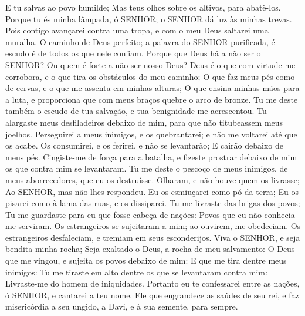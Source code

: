 {{  E tu salvas ao povo humilde; Mas teus olhos {} sobre os altivos, para abatê-los.
  Porque tu és minha lâmpada, ó SENHOR; o SENHOR dá luz às minhas trevas.
  Pois contigo avançarei contra uma tropa, e com o meu Deus saltarei uma muralha.
  O caminho de Deus {} perfeito; a palavra do SENHOR {} purificada, é escudo é de todos os que nele confiam.
  Porque que Deus há a não ser o SENHOR? Ou quem é forte a não ser nosso Deus?
  Deus é o que com virtude me corrobora, e o que tira os obstáculos do meu caminho;
  O que faz meus pés como de cervas, e o que me assenta em minhas alturas;
  O que ensina minhas mãos para a luta, e proporciona que com meus braços quebre o arco de bronze.
  Tu me deste também o escudo de tua salvação, e tua benignidade me acrescentou.
  Tu alargaste meus desfiladeiros debaixo de mim, para que não titubeassem meus joelhos.
  Perseguirei a meus inimigos, e os quebrantarei; e não me voltarei até que os acabe.
  Os consumirei, e os ferirei, e não se levantarão; E cairão debaixo de meus pés.
  Cingiste-me de força para a batalha, e fizeste prostrar debaixo de mim os que contra mim se levantaram.
  Tu me deste o pescoço de meus inimigos, de meus aborrecedores, que eu os destruísse.
  Olharam, e não houve quem os livrasse; Ao SENHOR, mas não lhes respondeu.
  Eu os esmiuçarei como pó da terra; Eu os pisarei como à lama das ruas, e os dissiparei.
  Tu me livraste das brigas dos povos; Tu me guardaste para eu que fosse cabeça de nações: Povos que eu não conhecia me serviram.
  Os estrangeiros se sujeitaram a mim; ao ouvirem, me obedeciam.
  Os estrangeiros desfaleciam, e tremiam em seus esconderijos.
  Viva o SENHOR, e seja bendita minha rocha; Seja exaltado o Deus, a rocha de meu salvamento:
  O Deus que me vingou, e sujeita os povos debaixo de mim:
  E que me tira dentre meus inimigos: Tu me tiraste em alto dentre os que se levantaram contra mim: Livraste-me do homem de iniquidades.
  Portanto eu te confessarei entre as nações, ó SENHOR, e cantarei a teu nome.
  Ele que engrandece as saúdes de seu rei, e faz misericórdia a seu ungido, a Davi, e à sua semente, para sempre}.
\par }

